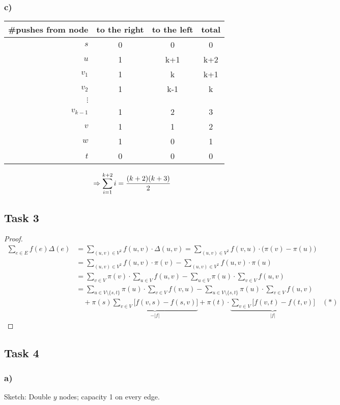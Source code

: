 \documentclass[12pt,oneside,a4paper,parskip=on,fleqn]{scrartcl}
\begin{document}
\subsubsection*{c)}
\begin{center}
\begin{tabular}{r||c|c|c}
	\#pushes from node&	to the right & to the left & total\\\hline\hline
	$s$ & 0 & 0 & 0 \\\hline
	$u$ & 1 & k+1 & k+2 \\\hline
	$v_1$ & 1 & k & k+1 \\\hline
	$v_2$ & 1 & k-1 & k \\
	$\vdots$ &  &  &  \\\hline
	$v_{k-1}$ & 1 & 2 & 3 \\\hline
	$v$ & 1 & 1 & 2 \\\hline
	$w$ & 1 & 0 & 1 \\\hline
	$t$ & 0 & 0 & 0	
\end{tabular}\end{center}
\[
	\Rightarrow \sum_{i=1}^{k+2} i = \frac{(k+2)(k+3)}{2}
\]

\subsection*{Task 3}
\begin{proof}
\begin{align*}
	\sum_{e\in E} f(e) \Delta(e) &= \sum_{(u,v) \in V^2} f(u,v) \cdot \Delta(u,v) = \sum_{(u,v)\in V^2} f(v,u) \cdot \bigl( \pi(v) - \pi(u) \bigr)\\
	&= \sum_{(u,v)\in V^2} f(u,v) \cdot \pi(v) - \sum_{(u,v)\in V^2} f(u,v) \cdot \pi(u)\\
	&= \sum_{v\in V} \pi(v) \cdot \sum_{u\in V} f(u,v) - \sum_{u\in V} \pi(u) \cdot \sum_{v\in V} f(u,v)\\
	&= \sum_{u\in V\setminus\{s,t\}} \pi(u)\cdot \sum_{v\in V} f(v,u) - \sum_{u\in V\setminus\{s,t\}} \pi(u) \cdot \sum_{v\in V} f(u,v)\\
	&\quad+ \pi(s) \underbrace{\sum_{v\in V} \bigl[ f(v,s) - f(s,v) \bigr]}_{-|f|} + \pi(t) \cdot \underbrace{\sum_{v\in V} \bigl[ f(v,t) - f(t,v) \bigr]}_{|f|} \quad (*)
\end{align*}
\end{proof}

\subsection*{Task 4}
\subsubsection*{a)}
Sketch: Double $y$ nodes; capacity 1 on every edge.
\end{document}
